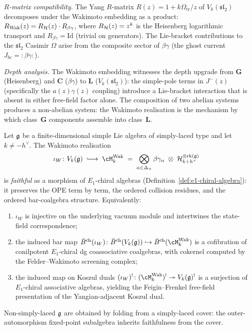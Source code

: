 \begin{computation}
\smallskip
\noindent
\emph{$R$-matrix compatibility.}
The Yang $R$-matrix
$R(z) = 1 + k\Omega_{\mathrm{tr}}/z$ of $V_k(\mathfrak{sl}_2)$
decomposes under the Wakimoto embedding as a product:
$R_{\mathrm{Wak}}(z) = R_{\mathcal{H}}(z) \cdot R_{\beta\gamma}$,
where $R_{\mathcal{H}}(z)=z^k$ is the Heisenberg logarithmic transport and
$R_{\beta\gamma} = \mathrm{Id}$ (trivial on generators).
The Lie-bracket contributions to the $\mathfrak{sl}_2$
Casimir $\Omega$ arise from the composite sector of
$\beta\gamma$ (the ghost current $J_{bc} = {:}\beta\gamma{:}$).

\smallskip
\noindent
\emph{Depth analysis.}
The Wakimoto embedding witnesses the depth upgrade from
$\mathbf{G}$ (Heisenberg) and $\mathbf{C}$ ($\beta\gamma$)
to $\mathbf{L}$ ($V_k(\mathfrak{sl}_2)$): the simple-pole
terms in $J^-(z)$ (specifically the $a(z)\gamma(z)$ coupling)
introduce a Lie-bracket interaction that is absent in either
free-field factor alone. The composition of two abelian
systems produces a non-abelian system: the Wakimoto realisation
is the mechanism by which class~$\mathbf{G}$ components
assemble into class~$\mathbf{L}$.
\end{computation}

\begin{proposition}%
\label{prop:wakimoto-faithful-chiral}%
%
%
%
Let $\mathfrak{g}$ be a finite-dimensional simple Lie algebra of
simply-laced type and let $k \neq -h^\vee$. The Wakimoto
realisation
\[
 \iota_W \colon V_k(\fg) \;\lhook\joinrel\longrightarrow\;
 \cM_k^{\mathrm{Wak}}
 \;=\; \bigotimes_{\alpha \in \Delta_+}
 \beta\gamma_\alpha
 \;\otimes\; \cH_{k+h^\vee}^{\otimes \mathrm{rk}(\fg)}
\]
is \emph{faithful} as a morphism of $E_1$-chiral algebras
(Definition~\ref{def:e1-chiral-algebra}): it preserves the
OPE term by term, the ordered collision residues, and the
ordered bar-coalgebra structure. Equivalently:
\begin{enumerate}[label=\textup{(\roman*)}]
\item $\iota_W$ is injective on the underlying vacuum module
and intertwines the state-field correspondence;
\item the induced bar map
$\barBch(\iota_W) \colon \barBch(V_k(\fg))
\hookrightarrow \barBch(\cM_k^{\mathrm{Wak}})$
is a cofibration of conilpotent $E_1$-chiral dg coassociative
coalgebras, with cokernel computed by the Felder--Wakimoto
screening complex;
\item the induced map on Koszul duals
$(\iota_W)^! \colon (\cM_k^{\mathrm{Wak}})^!
\twoheadrightarrow V_k(\fg)^!$
is a surjection of $E_1$-chiral associative algebras,
yielding the Feigin--Frenkel free-field presentation of
the Yangian-adjacent Koszul dual.
\end{enumerate}
Non-simply-laced $\mathfrak{g}$ are obtained by folding from a
simply-laced cover: the outer-automorphism fixed-point
subalgebra inherits faithfulness from the cover.
\end{proposition}

